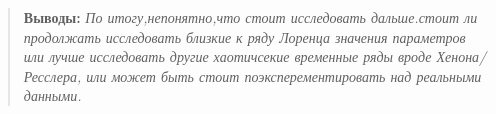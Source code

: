 \documentclass[a4paper, 12pt]{article}
\newenvironment{conclusion}
  {\begin{quote}\noindent\textbf{Выводы: }\itshape}
  {\end{quote}}
\begin{document}
\newpage
\begin{conclusion}
    По итогу,непонятно,что стоит исследовать дальше.стоит ли продолжать исследовать
     близкие к ряду Лоренца значения параметров или лучше исследовать другие хаотичсекие временные ряды вроде Хенона/Ресслера,
     или может быть стоит поэксперементировать над реальными данными.
\end{conclusion}
\end{document}
